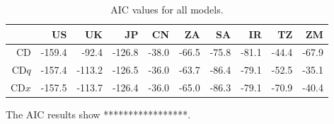 \documentclass[preprint,authoryear,12pt]{elsarticle}\usepackage{graphicx, color}
\begin{document}
\begin{table}[ht]
\begin{center}
\caption{AIC values for all models.}
\label{tab:AICTable}
\begin{tabular}{rrrrrrrrrr}
  \hline
 & US & UK & JP & CN & ZA & SA & IR & TZ & ZM \\ 
  \hline
CD & -159.4 & -92.4 & -126.8 & -38.0 & -66.5 & -75.8 & -81.1 & -44.4 & -67.9 \\ 
  CD$q$ & -157.4 & -113.2 & -126.5 & -36.0 & -63.7 & -86.4 & -79.1 & -52.5 & -35.1 \\ 
  CD$x$ & -157.5 & -113.7 & -126.4 & -36.0 & -65.0 & -86.3 & -79.1 & -70.9 & -40.4 \\ 
   \hline
\end{tabular}
\end{center}
\end{table}



The AIC results show *****************.


\end{document}
